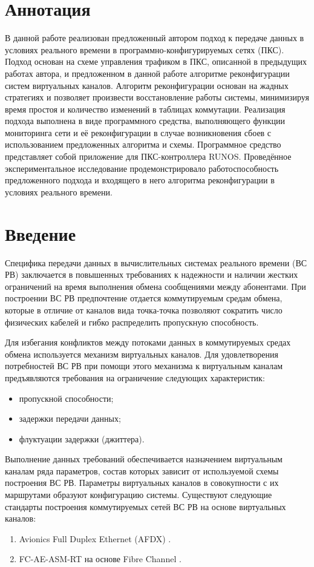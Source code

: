 \documentclass[12pt, a4paper]{article}
\begin{document}
\section*{Аннотация}
В данной работе реализован предложенный автором подход к передаче данных в условиях реального времени в программно-конфигурируемых сетях (ПКС). Подход основан на схеме управления трафиком в ПКС, описанной в предыдущих работах автора, и предложенном в данной работе алгоритме реконфигурации систем виртуальных каналов. Алгоритм реконфигурации основан на жадных стратегиях и позволяет произвести восстановление работы системы, минимизируя время простоя и количество изменений в таблицах коммутации. Реализация подхода выполнена в виде программного средства, выполняющего функции мониторинга сети и её реконфигурации в случае возникновения сбоев с использованием предложенных алгоритма и схемы. Программное средство представляет собой приложение для ПКС-контроллера RUNOS. Проведённое экспериментальное исследование продемонстрировало работоспособность предложенного подхода и входящего в него алгоритма реконфигурации в условиях реального времени.

\renewcommand{\contentsname}{Содержание}
\tableofcontents

\section*{Введение}
Специфика передачи данных в вычислительных системах реального времени (ВС РВ) заключается в повышенных требованиях к надежности и наличии жестких ограничений на время выполнения обмена сообщениями между абонентами. При построении ВС РВ предпочтение отдается коммутируемым средам обмена, которые в отличие от каналов вида точка-точка позволяют сократить число физических кабелей и гибко распределить пропускную способность.

Для избегания конфликтов между потоками данных в коммутируемых средах обмена используется механизм виртуальных каналов. Для удовлетворения потребностей ВС РВ при помощи этого механизма к виртуальным каналам предъявляются требования на ограничение следующих характеристик:
\begin{itemize}
	\item пропускной способности;
	\item задержки передачи данных;
	\item флуктуации задержки (джиттера).
\end{itemize}

Выполнение данных требований обеспечивается назначением виртуальным каналам ряда параметров, состав которых зависит от используемой схемы построения ВС РВ. Параметры виртуальных каналов в совокупности с их маршрутами образуют конфигурацию системы. Существуют следующие стандарты построения коммутируемых сетей ВС РВ на основе виртуальных каналов:
\begin{enumerate}
	\item Avionics Full Duplex Ethernet (AFDX) \cite{afdx}.
	\item FC-AE-ASM-RT на основе Fibre Channel \cite{fcaert}.
\end{enumerate}
\end{document}

